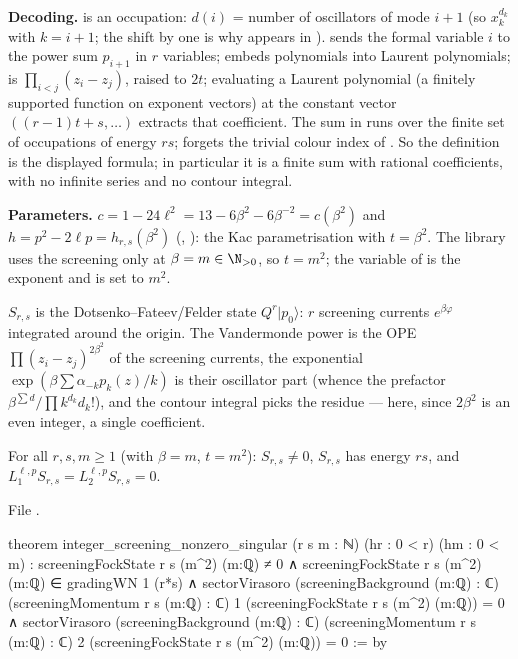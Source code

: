 \begin{dictionary}
\textbf{Decoding.}  is an occupation: $d(i)$ = number of oscillators of mode $i+1$ (so
$x_k^{d_k}$ with $k = i+1$; the shift by one is why  appears in ).
 sends the formal variable $i$ to the power sum $p_{i+1}$ in $r$ variables;
 embeds polynomials into Laurent polynomials;  is
$\prod_{i<j}(z_i-z_j)$, raised to $2t$; evaluating a Laurent polynomial (a finitely supported function on
exponent vectors) at the constant vector $((r-1)t+s,\dots)$ extracts that coefficient. The sum in
 runs over the finite set of occupations of energy $rs$; 
forgets the trivial colour index of . So the definition is the displayed formula; in
particular it is a finite sum with rational coefficients, with no infinite series and no contour integral.

\textbf{Parameters.} $c = 1-24\ell^2 = 13-6\beta^2-6\beta^{-2} = c(\beta^2)$ and
$h = p^2-2\ell p = h_{r,s}(\beta^2)$ (\allowbreak{}\allowbreak{}, \allowbreak{}\allowbreak{}): the
Kac parametrisation with $t = \beta^2$. The library uses the screening only at $\beta = m\in\N_{>0}$, so
$t = m^2$; the variable  of  is the exponent and is set to $m^2$.
\end{dictionary}

\begin{physics}
$S_{r,s}$ is the Dotsenko--Fateev/Felder state $Q^r|p_0\rangle$: $r$ screening currents $e^{\beta\varphi}$
integrated around the origin. The Vandermonde power is the OPE $\prod(z_i-z_j)^{2\beta^2}$ of the screening
currents, the exponential $\exp(\beta\sum\alpha_{-k}p_k(z)/k)$ is their oscillator part (whence the
prefactor $\beta^{\sum d}/\prod k^{d_k}d_k!$), and the contour integral picks the residue --- here, since
$2\beta^2$ is an even integer, a single coefficient.
\end{physics}

\begin{theorem}\label{l06:thm:screensing}
For all $r,s,m\ge1$ (with $\beta = m$, $t = m^2$): $S_{r,s}\ne0$, $S_{r,s}$ has energy $rs$, and
$L^{\ell,p}_1S_{r,s} = L^{\ell,p}_2S_{r,s} = 0$.
\end{theorem}

File .
\begin{leancode}
theorem integer_screening_nonzero_singular (r s m : ℕ) (hr : 0 < r) (hm : 0 < m) :
    screeningFockState r s (m^2) (m:ℚ) ≠ 0 ∧
    screeningFockState r s (m^2) (m:ℚ) ∈ gradingWN 1 (r*s) ∧
    sectorVirasoro (screeningBackground (m:ℚ) : ℂ)
      (screeningMomentum r s (m:ℚ) : ℂ) 1 (screeningFockState r s (m^2) (m:ℚ)) = 0 ∧
    sectorVirasoro (screeningBackground (m:ℚ) : ℂ)
      (screeningMomentum r s (m:ℚ) : ℂ) 2 (screeningFockState r s (m^2) (m:ℚ)) = 0 := by
\end{leancode}

